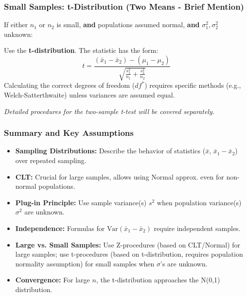 \documentclass[handout]{beamer} %
\begin{document}
\begin{frame}
\frametitle{Small Samples: t-Distribution (Two Means - Brief Mention)}
If either \(n_1\) or \(n_2\) is small, \textbf{and} populations assumed normal, \textbf{and} \(\sigma^2_1, \sigma^2_2\) unknown:

\pause
Use the \textbf{t-distribution}. The statistic has the form:
\[
t = \frac{(\bar{x}_1 - \bar{x}_2) - (\mu_1 - \mu_2)}{\sqrt{\frac{s^2_1}{n_1} + \frac{s^2_2}{n_2}}}
\]
\pause
Calculating the correct degrees of freedom (\(df^*\)) requires specific methods (e.g., Welch-Satterthwaite) unless variances are assumed equal.

\pause
\textit{Detailed procedures for the two-sample t-test will be covered separately.}
\end{frame}

\begin{frame}[fragile]
\frametitle{Summary and Key Assumptions} %
\begin{itemize}
    \item \textbf{Sampling Distributions:} Describe the behavior of statistics (\(\bar{x}\), \(\bar{x}_1 - \bar{x}_2\)) over repeated sampling.
    \item \textbf{CLT:} Crucial for large samples, allows using Normal approx. even for non-normal populations.
    \item \textbf{Plug-in Principle:} Use sample variance(s) \(s^2\) when population variance(s) \(\sigma^2\) are unknown.
    \item \textbf{Independence:} Formulas for \(\text{Var}(\bar{x}_1 - \bar{x}_2)\) require independent samples.
    \item \textbf{Large vs. Small Samples:} Use Z-procedures (based on CLT/Normal) for large samples; use t-procedures (based on t-distribution, requires population normality assumption) for small samples when \(\sigma\)'s are unknown.
    \item \textbf{Convergence:} For large \(n\), the t-distribution approaches the N(0,1) distribution.
\end{itemize}
\end{frame}
\end{document}
